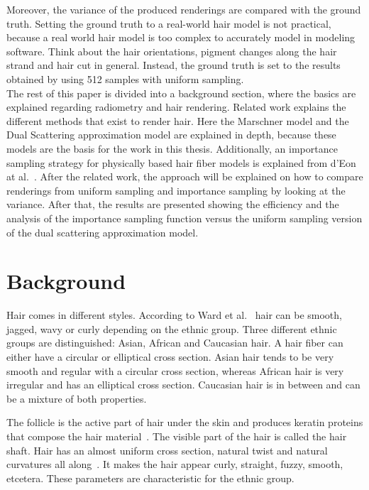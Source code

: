 \documentclass[11pt,a4paper]{report}
\begin{document}
Moreover, the variance of the produced renderings are compared with the ground truth. Setting the ground truth to a real-world hair model is not practical, because a real world hair model is too complex to accurately model in modeling software. Think about the hair orientations, pigment changes along the hair strand and hair cut in general. Instead, the ground truth is set to the results obtained by using 512 samples with uniform sampling.\\

The rest of this paper is divided into a background section, where the basics are explained regarding radiometry and hair rendering. Related work explains the different methods that exist to render hair. Here the Marschner model and the Dual Scattering approximation model are explained in depth, because these models are the basis for the work in this thesis. Additionally, an importance sampling strategy for physically based hair fiber models is explained from d'Eon at al.~\cite{eon2013}. After the related work, the approach will be explained on how to compare renderings from uniform sampling and importance sampling by looking at the variance. After that, the results are presented showing the efficiency and the analysis of the importance sampling function versus the uniform sampling version of the dual scattering approximation model.

%
%

\chapter{Background}

Hair comes in different styles. According to Ward et al.~\cite{ward} hair can be smooth, jagged, wavy or curly depending on the ethnic group. Three different ethnic groups are distinguished: Asian, African and Caucasian hair. A hair fiber can either have a circular or elliptical cross section. Asian hair tends to be very smooth and regular with a circular cross section, whereas African hair is very irregular and has an elliptical cross section. Caucasian hair is in between and can be a mixture of both properties.

The follicle is the active part of hair under the skin and produces keratin proteins that compose the hair material~\cite{hadap}. The visible part of the hair is called the hair shaft. Hair has an almost uniform cross section, natural twist and natural curvatures all along~\cite{hadap}. It makes the hair appear curly, straight, fuzzy, smooth, etcetera. These parameters are characteristic for the ethnic group.
\end{document}
